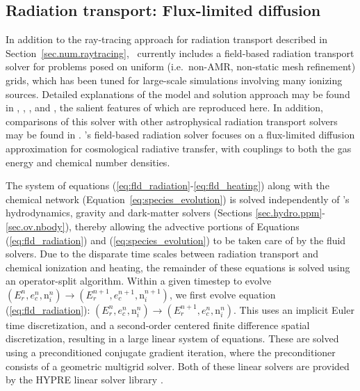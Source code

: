 \subsection{Radiation transport: Flux-limited diffusion}
\label{sec.num.rad-fld}

In addition to the ray-tracing approach for radiation transport
described in Section~\ref{sec.num.raytracing}, \enzo\ currently
includes a field-based radiation transport solver for problems posed
on uniform (i.e.~non-AMR, non-static mesh refinement) grids, which has
been tuned for large-scale simulations involving many ionizing
sources.  Detailed explanations of the model and solution approach may
be found in \citet{NBHBROW2007},
\citet{ReynoldsHayesPaschosNorman2009}, \citet{NRS2009}, and
\citet{2013arXiv1306.0645N}, the salient features of which are
reproduced here.  In addition, comparisons of this solver with other
astrophysical radiation transport solvers may be found in
\cite{IlievEtAl2009}.  \enzo's field-based radiation solver focuses on
a flux-limited diffusion approximation for cosmological radiative
transfer, with couplings to both the gas energy and chemical number
densities.


The system of equations (\ref{eq:fld_radiation}-\ref{eq:fld_heating})
along with the chemical network (Equation~\ref{eq:species_evolution})
is solved independently of \enzo's hydrodynamics, gravity and
dark-matter solvers (Sections \ref{sec.hydro.ppm}-\ref{sec.ov.nbody}),
thereby allowing the advective portions of Equations
(\ref{eq:fld_radiation}) and (\ref{eq:species_evolution}) to be taken
care of by the fluid solvers.  Due to the disparate time scales
between radiation transport and chemical ionization and heating, the
remainder of these equations is solved using an operator-split
algorithm.  Within a given timestep to evolve $(E_r^n, e_c^n, {\mathrm
n}_i^n) \to (E_r^{n+1}, e_c^{n+1}, {\mathrm n}_i^{n+1})$, we first
evolve equation (\ref{eq:fld_radiation}): $(E_r^n, e_c^n, {\mathrm
n}_i^n) \to (E_r^{n+1}, e_c^{n}, {\mathrm n}_i^{n})$.  This uses an
implicit Euler time discretization, and a second-order centered finite
difference spatial discretization, resulting in a large linear system
of equations.  These are solved using a preconditioned conjugate
gradient iteration, where the preconditioner consists of a geometric
multigrid solver.  Both of these linear solvers are provided by the
HYPRE linear solver library \citep[see][]{FalgoutYang2002,
hypre-manual}.

